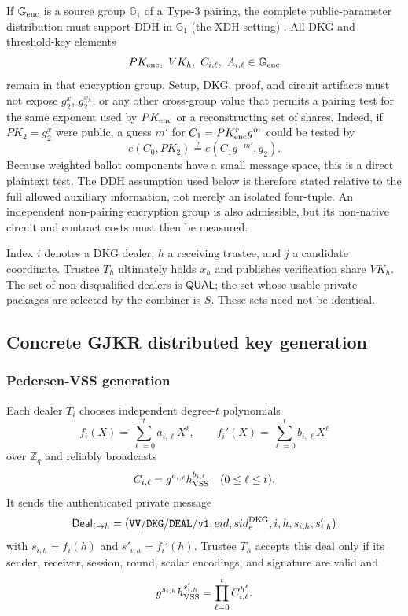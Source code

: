 \documentclass[pdflatex,sn-mathphys-num]{sn-jnl}%
\theoremstyle{thmstyleone}%
\theoremstyle{thmstyletwo}%
\theoremstyle{thmstylethree}%
\begin{document}
If $\mathbb G_{\rm enc}$ is a source group $\mathbb G_1$ of a Type-3 pairing,
the complete public-parameter distribution must support DDH in
$\mathbb G_1$ (the XDH setting) \cite{bib135}.  All DKG and threshold-key
elements
\[
 PK_{\rm enc},\ VK_h,\ C_{i,\ell},\ A_{i,\ell}
 \in\mathbb G_{\rm enc}
\]
remain in that encryption group.  Setup, DKG, proof, and circuit artifacts must
not expose $g_2^x$, $g_2^{x_h}$, or any other cross-group value that permits a
pairing test for the same exponent used by $PK_{\rm enc}$ or a reconstructing
set of shares.  Indeed, if $PK_2=g_2^x$ were public, a guess $m'$ for
$C_1=PK_{\rm enc}^{r}g^m$ could be tested by
\[
 e(C_0,PK_2)\stackrel{?}{=}e(C_1g^{-m'},g_2).
\]
Because weighted ballot components have a small message space, this is a
direct plaintext test.  The DDH assumption used below is therefore stated
relative to the full allowed auxiliary information, not merely an isolated
four-tuple.  An independent non-pairing encryption group is also admissible,
but its non-native circuit and contract costs must then be measured.

Index $i$ denotes a DKG dealer, $h$ a receiving trustee, and $j$ a candidate
coordinate.  Trustee $T_h$ ultimately holds $x_h$ and publishes verification
share $VK_h$.  The set of non-disqualified dealers is $\mathsf{QUAL}$; the set
whose usable private packages are selected by the combiner is $S$.  These sets
need not be identical.

\subsection{Concrete GJKR distributed key generation}
\label{subsec:threshold-dkg}

\subsubsection{Pedersen-VSS generation}
Each dealer $T_i$ chooses independent degree-$t$ polynomials
\[
 f_i(X)=\sum_{\ell=0}^{t}a_{i,\ell}X^\ell,
 \qquad
 f_i'(X)=\sum_{\ell=0}^{t}b_{i,\ell}X^\ell
\]
over $\mathbb Z_q$ and reliably broadcasts
\[
 C_{i,\ell}=g^{a_{i,\ell}}h_{\rm VSS}^{b_{i,\ell}}
 \quad(0\leq\ell\leq t).
\]
It sends the authenticated private message
\[
 \mathsf{Deal}_{i\rightarrow h}=
 (\mathtt{VV/DKG/DEAL/v1},eid,sid_e^{\rm DKG},i,h,
   s_{i,h},s'_{i,h})
\]
with $s_{i,h}=f_i(h)$ and $s'_{i,h}=f_i'(h)$.  Trustee $T_h$ accepts this
deal only if its sender, receiver, session, round, scalar encodings, and
signature are valid and
\[
 g^{s_{i,h}}h_{\rm VSS}^{s'_{i,h}}
 =\prod_{\ell=0}^{t}C_{i,\ell}^{h^\ell}.
\]
\end{document}
